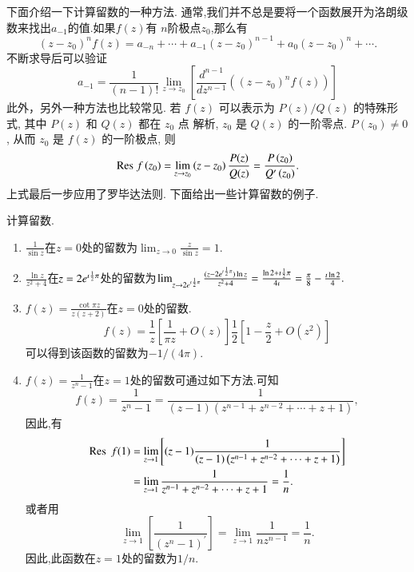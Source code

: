 下面介绍一下计算留数的一种方法.
通常,我们并不总是要将一个函数展开为洛朗级数来找出$a_{-1}$的值.如果$f(z)$有
$n$阶极点$z_0$,那么有
\begin{equation}
    \left(z-z_0\right)^n f(z)=a_{-n}+\cdots+a_{-1}\left(z-z_0\right)^{n-1}+a_0\left(z-z_0\right)^n+\cdots .
\end{equation}
不断求导后可以验证
\begin{equation}
    a_{-1}=\frac{1}{(n-1) !} \lim _{z \to z_0}\left[\frac{d^{n-1}}{d z^{n-1}}\left(\left(z-z_0\right)^n f(z)\right)\right]
\end{equation}
此外，另外一种方法也比较常见. 若 $f(z)$ 可以表示为 $P(z) / Q(z)$ 的特殊形式, 其中 $P(z)$ 和 $Q(z)$ 都在 $z_0$ 点 解析, $z_0$ 是 $Q(z)$ 的一阶零点. $P\left(z_0\right) \neq 0$, 从而 $z_0$ 是 $f(z)$ 的一阶极点, 则
\begin{equation}
    {\mathrm{Res}\;} f\left(z_0\right)=\lim _{z \to z_0}\left(z-z_0\right) \frac{P(z)}{Q(z)}=\frac{P\left(z_0\right)}{Q^{\prime}\left(z_0\right)} .
\end{equation}
上式最后一步应用了罗毕达法则.
下面给出一些计算留数的例子.
\begin{examplebox}{计算留数.}
    
    \begin{enumerate}
        \item $\frac{1}{\sin z}$在$z=0$处的留数为$\lim_{z\to 0} \frac{z}{\sin{z}} = 1$.
        \item $\frac{\ln{z}}{z^2 + 4}$在$z=2e^{\imath {\frac{1}{2}} \pi}$处的留数为$\lim_{z\to 2e^{\imath {\frac{1}{2}} \pi}} \frac{(z-2e^{\imath {\frac{1}{2}}\pi})\ln{z} }{z^2 + 4} = 
        \frac{\ln 2 + \imath {\frac{1}{2}} \pi}{4\imath} = \frac{\pi}{8} - \frac{\imath\ln{2}}{4}.$
        \item $f(z) = \frac{\cot{\pi z}}{z(z+2)}$在$z=0$处的留数.\\
            $$
              f(z) = \frac{1}{z} \left[\frac{1}{\pi z} + O(z) \right]\frac{1}{2} \left[1 - \frac{z}{2} + O(z^2)\right]  
            $$
            可以得到该函数的留数为$-1/(4\pi)$.
        \item $f(z) = \frac{1}{z^n - 1}$在$z=1$处的留数可通过如下方法.可知
        $$
            f(z)=\frac{1}{z^n-1}=\frac{1}{(z-1)\left(z^{n-1}+z^{n-2}+\cdots+z+1\right)},
        $$
        因此,有
        $$
            \begin{aligned}
                \operatorname{{\mathrm{Res}\;}} f(1) & =\lim _{z \to 1}\left[(z-1) \frac{1}{(z-1)\left(z^{n-1}+z^{n-2}+\cdots+z+1\right)}\right] \\
                & =\lim _{z \to 1} \frac{1}{z^{n-1}+z^{n-2}+\cdots+z+1}=\frac{1}{n} .
            \end{aligned}
        $$
        或者用 $$
        \lim _{z \to 1}\left[\frac{1}{\left(z^n-1\right)^{\prime}}\right]=\lim _{z \to 1} \frac{1}{n z^{n-1}}=\frac{1}{n} .
        $$ 因此,此函数在$z=1$处的留数为$1/n$.
    \end{enumerate}
\end{examplebox}

